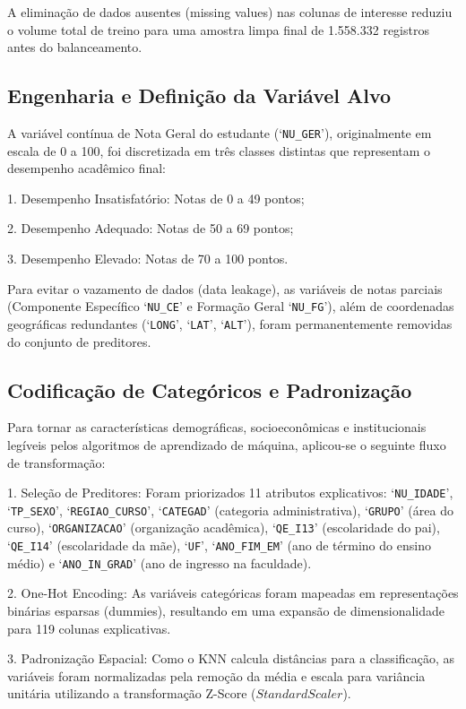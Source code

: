 \documentclass[12pt]{article}
\begin{document}
A eliminação de dados ausentes (missing values) nas colunas de interesse reduziu o volume total de treino para uma amostra limpa final de 1.558.332 registros antes do balanceamento.

\subsection{Engenharia e Definição da Variável Alvo}

A variável contínua de Nota Geral do estudante (`\texttt{NU\_GER}'), originalmente em escala de 0 a 100, foi discretizada em três classes distintas que representam o desempenho acadêmico final:

1. Desempenho Insatisfatório: Notas de 0 a 49 pontos;

2. Desempenho Adequado: Notas de 50 a 69 pontos;

3. Desempenho Elevado: Notas de 70 a 100 pontos.

Para evitar o vazamento de dados (data leakage), as variáveis de notas parciais (Componente Específico `\texttt{NU\_CE}' e Formação Geral `\texttt{NU\_FG}'), além de coordenadas geográficas redundantes (`\texttt{LONG}', `\texttt{LAT}', `\texttt{ALT}'), foram permanentemente removidas do conjunto de preditores.

\subsection{Codificação de Categóricos e Padronização}

Para tornar as características demográficas, socioeconômicas e institucionais legíveis pelos algoritmos de aprendizado de máquina, aplicou-se o seguinte fluxo de transformação:

1. Seleção de Preditores: Foram priorizados 11 atributos explicativos: `\texttt{NU\_IDADE}', `\texttt{TP\_SEXO}', `\texttt{REGIAO\_CURSO}', `\texttt{CATEGAD}' (categoria administrativa), `\texttt{GRUPO}' (área do curso), `\texttt{ORGANIZACAO}' (organização acadêmica), `\texttt{QE\_I13}' (escolaridade do pai), `\texttt{QE\_I14}' (escolaridade da mãe), `\texttt{UF}', `\texttt{ANO\_FIM\_EM}' (ano de término do ensino médio) e `\texttt{ANO\_IN\_GRAD}' (ano de ingresso na faculdade).

2. One-Hot Encoding: As variáveis categóricas foram mapeadas em representações binárias esparsas (dummies), resultando em uma expansão de dimensionalidade para 119 colunas explicativas.

3. Padronização Espacial: Como o KNN calcula distâncias para a classificação, as variáveis foram normalizadas pela remoção da média e escala para variância unitária utilizando a transformação Z-Score ($StandardScaler$).
\end{document}
